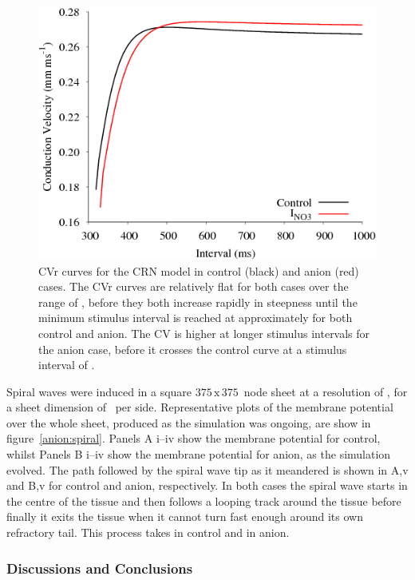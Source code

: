 \begin{figure}
\includegraphics{figures/toolkit/anion/06_CV}
\caption[Anion Sensitive Conduction Velocity Restitution]{
\label{anion:cvr} CVr curves for the CRN model in control (black) and anion
(red) cases. The CVr curves are relatively flat for both cases over the range of
, before they both increase rapidly in steepness until the minimum
stimulus interval is reached at approximately  for both control and anion.
The CV is higher at longer stimulus intervals for the anion case, before it
crosses the control curve at a stimulus interval of .}
\end{figure}

Spiral waves were induced in a square $375\,\text{x}\,375$\ node sheet at a
resolution of , for a sheet dimension of \ per
side.  Representative plots of the membrane potential over the whole sheet,
produced as the simulation was ongoing, are show in figure~\ref{anion:spiral}.
Panels A i--iv show the membrane potential for control, whilst Panels B i--iv
show the membrane potential for anion, as the simulation evolved.  The path
followed by the spiral wave tip as it meandered is shown in A,v and B,v for
control and anion, respectively.  In both cases the spiral wave starts in the
centre of the tissue and then follows a looping track around the tissue before
finally it exits the tissue when it cannot turn fast enough around its own
refractory tail.  This process takes  in control and  in
anion.

\subsubsection{Discussions and Conclusions}

